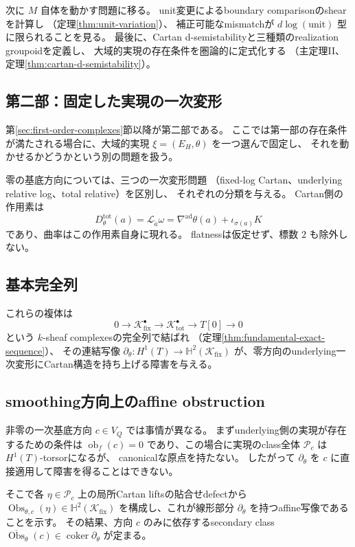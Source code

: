 \documentclass[uplatex,dvipdfmx,11pt]{jsarticle}
\numberwithin{equation}{section}
\theoremstyle{plain}
\theoremstyle{definition}
\theoremstyle{remark}
\DeclareMathOperator{\coker}{coker}
\DeclareMathOperator{\Obs}{Obs}
\DeclareMathOperator{\obf}{ob}
\newcommand{\Kfix}{\mathcal K_{\mathrm{fix}}^\bullet}
\newcommand{\Ktot}{\mathcal K_{\mathrm{tot}}^\bullet}
\newcommand{\Dtot}{D_\theta^{\mathrm{tot}}}
\newcommand{\nablaad}{\nabla^{\mathrm{ad}}}
\newcommand{\Hyp}{\mathbb H}
\begin{document}
次に \(M\) 自体を動かす問題に移る。
unit変更によるboundary comparisonのshearを計算し
（定理\ref{thm:unit-variation}）、
補正可能なmismatchが \(d\log(\text{unit})\) 型に限られることを見る。
最後に、Cartan d-semistabilityと三種類のrealization groupoidを定義し、
大域的実現の存在条件を圏論的に定式化する
（主定理II、定理\ref{thm:cartan-d-semistability}）。

\subsection*{第二部：固定した実現の一次変形}

第\ref{sec:first-order-complexes}節以降が第二部である。
ここでは第一部の存在条件が満たされる場合に、大域的実現
\(\xi=(E_H,\theta)\) を一つ選んで固定し、
それを動かせるかどうかという別の問題を扱う。

零の基底方向については、三つの一次変形問題
（fixed-log Cartan、underlying relative log、total relative）を区別し、
それぞれの分類を与える。
Cartan側の作用素は
\[
\Dtot(a)=\mathcal L_{\widetilde a}\omega
=\nablaad\theta(a)+\iota_{\sigma(a)}K
\]
であり、曲率はこの作用素自身に現れる。
flatnessは仮定せず、標数 \(2\) も除外しない。

\subsection*{基本完全列}

これらの複体は
\[
0\longrightarrow\Kfix\longrightarrow\Ktot\longrightarrow T[0]\longrightarrow0
\]
という \(k\)-sheaf complexesの完全列で結ばれ
（定理\ref{thm:fundamental-exact-sequence}）、
その連結写像
\(\partial_\theta:H^1(T)\to\Hyp^2(\mathcal K_{\mathrm{fix}})\)
が、零方向のunderlying一次変形にCartan構造を持ち上げる障害を与える。

\subsection*{smoothing方向上のaffine obstruction}

非零の一次基底方向 \(c\in V_Q\) では事情が異なる。
まずunderlying側の実現が存在するための条件は
\(\obf_f(c)=0\) であり、この場合に実現のclass全体
\(\mathcal P_c\) は \(H^1(T)\)-torsorになるが、
canonicalな原点を持たない。
したがって \(\partial_\theta\) を \(c\) に直接適用して障害を得ることはできない。

そこで各 \(\eta\in\mathcal P_c\) 上の局所Cartan liftsの貼合せdefectから
\(\Obs_{\theta,c}(\eta)\in\Hyp^2(\mathcal K_{\mathrm{fix}})\)
を構成し、これが線形部分 \(\partial_\theta\) を持つaffine写像であることを示す。
その結果、方向 \(c\) のみに依存するsecondary class
\(\overline{\Obs}_\theta(c)\in\coker\partial_\theta\)
が定まる。
\end{document}
